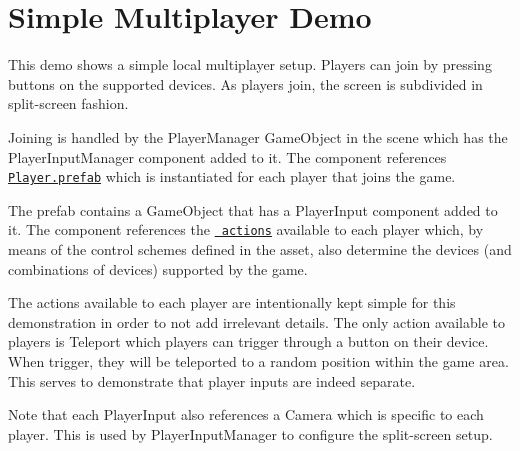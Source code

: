 \chapter{Simple Multiplayer Demo}
\hypertarget{md__hey_tea_9_2_library_2_package_cache_2com_8unity_8inputsystem_0d1_86_83_2_samples_0i_2_simple_multiplayer_2_r_e_a_d_m_e}{}\label{md__hey_tea_9_2_library_2_package_cache_2com_8unity_8inputsystem_0d1_86_83_2_samples_0i_2_simple_multiplayer_2_r_e_a_d_m_e}
\label{md__hey_tea_9_2_library_2_package_cache_2com_8unity_8inputsystem_0d1_86_83_2_samples_0i_2_simple_multiplayer_2_r_e_a_d_m_e_autotoc_md1618}%
%
 This demo shows a simple local multiplayer setup. Players can join by pressing buttons on the supported devices. As players join, the screen is subdivided in split-\/screen fashion.

Joining is handled by the {\ttfamily Player\+Manager} Game\+Object in the scene which has the {\ttfamily Player\+Input\+Manager} component added to it. The component references \href{./Player.prefab}{\texttt{ {\ttfamily Player.\+prefab}}} which is instantiated for each player that joins the game.

The prefab contains a Game\+Object that has a {\ttfamily Player\+Input} component added to it. The component references the \href{./SimpleMultiplayerControls.inputactions}{\texttt{ actions}} available to each player which, by means of the control schemes defined in the asset, also determine the devices (and combinations of devices) supported by the game.

The actions available to each player are intentionally kept simple for this demonstration in order to not add irrelevant details. The only action available to players is {\ttfamily Teleport} which players can trigger through a button on their device. When trigger, they will be teleported to a random position within the game area. This serves to demonstrate that player inputs are indeed separate.

Note that each {\ttfamily Player\+Input} also references a {\ttfamily Camera} which is specific to each player. This is used by {\ttfamily Player\+Input\+Manager} to configure the split-\/screen setup. 